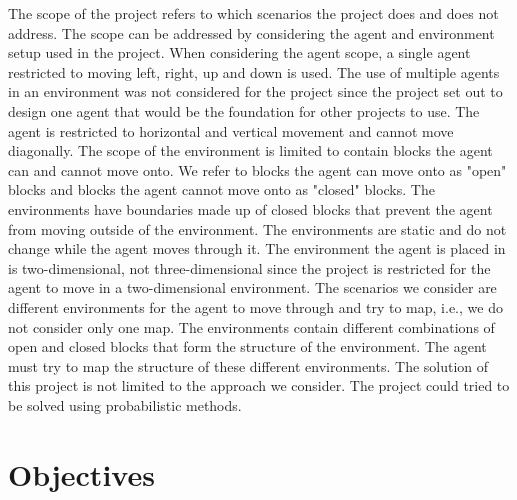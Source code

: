 The scope of the project refers to which scenarios the project does and does not address. The scope can be addressed by considering the agent and environment setup used in the project. When considering the agent scope, a single agent restricted to moving left, right, up and down is used. The use of multiple agents in an environment was not considered for the project since the project set out to design one agent that would be the foundation for other projects to use. The  agent is restricted to horizontal and vertical movement and cannot move diagonally.
The scope of the environment is limited to contain blocks the agent can and cannot move onto. We refer to blocks the agent can move onto as "open" blocks and blocks the agent cannot move onto as "closed" blocks. The environments have boundaries made up of closed blocks that prevent the agent from moving outside of the environment. The environments are static and do not change while the agent moves through it. The environment the agent is placed in is two-dimensional, not three-dimensional since the project is restricted for the agent to move in a two-dimensional environment.
The scenarios we consider are different environments for the agent to move through and try to map, i.e., we do not consider only one map. The environments contain different combinations of open and closed blocks that form the structure of the environment. The agent must try to map the structure of these different environments. The solution of this project is not limited to the approach we consider. The project could tried to be solved using probabilistic methods.



  





\section{Objectives}

%

